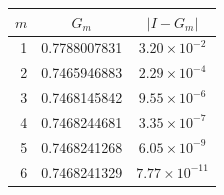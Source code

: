 \begin{tabular}{rcc}
\toprule
$m$ & $G_m$ & $\lvert I-G_m\rvert$ \\
\midrule
1 & 0.7788007831 & $3.20\times10^{-2}$ \\
2 & 0.7465946883 & $2.29\times10^{-4}$ \\
3 & 0.7468145842 & $9.55\times10^{-6}$ \\
4 & 0.7468244681 & $3.35\times10^{-7}$ \\
5 & 0.7468241268 & $6.05\times10^{-9}$ \\
6 & 0.7468241329 & $7.77\times10^{-11}$ \\
\bottomrule
\end{tabular}
